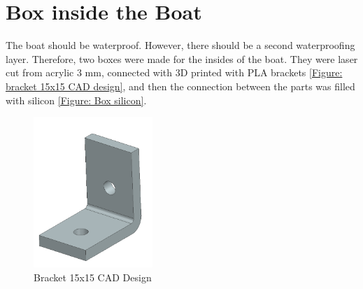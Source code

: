 \section{Box inside the Boat}
The boat should be waterproof. However, there should be a second waterproofing layer. Therefore, two boxes were made for the insides 
of the boat. They were laser cut from acrylic 3 mm, connected with 3D printed with PLA brackets \autoref{Figure: bracket 15x15 CAD design}, 
and then the connection between the parts was filled with silicon \autoref{Figure: Box silicon}. 
\begin{figure}[H]
    \centering
    \includegraphics[width=0.4\textwidth]{bracket_1.png}
    \caption{Bracket 15x15 CAD Design}
    \label{Figure: bracket 15x15 CAD design}
\end{figure} 
